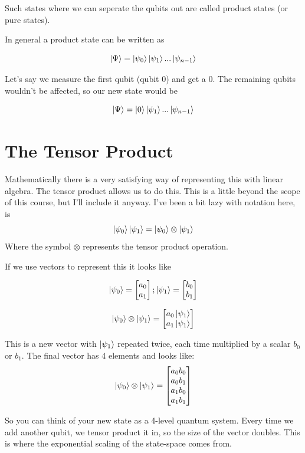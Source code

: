 \documentclass{book}
\begin{document}
Such states where we can seperate the qubits out are called product states (or pure states). 

In general a product state can be written as 

$$ \ket{\Psi} = \ket{\psi_0}\ket{\psi_1}...\ket{\psi_{n-1}}$$

Let's say we measure the first qubit (qubit 0) and get a 0. The remaining qubits wouldn't be affected, so our new state would be 

$$ \ket{\Psi} = \ket{0}\ket{\psi_1}...\ket{\psi_{n-1}}$$


\section{ The Tensor Product }

Mathematically there is a very satisfying way of representing this with linear algebra. The tensor product allows us to do this. This is a little beyond the scope of this course, but I'll include it anyway. 
I've been a bit lazy with notation here, is
$$ \ket{\psi_0}\ket{\psi_1} = \ket{\psi_0} \otimes \ket{\psi_1} $$
Where the symbol $\otimes$ represents the tensor product operation. 

If we use vectors to represent this it looks like 

$$ \ket{\psi_0} = \begin{bmatrix} a_0 \\ a_1 \end{bmatrix} ; \ket{\psi_1} = \begin{bmatrix} b_0 \\ b_1 \end{bmatrix} $$

$$
 \ket{\psi_0} \otimes \ket{\psi_1} = \begin{bmatrix} a_0\ket{\psi_1} \\ a_1\ket{\psi_1} \end{bmatrix}
$$

This is a new vector with $\ket{\psi_1}$ repeated twice, each time multiplied by a scalar $b_0$ or $b_1$. The final vector has 4 elements and looks like: 
$$
 \ket{\psi_0} \otimes \ket{\psi_1} = \begin{bmatrix} a_0 b_0 \\ a_0 b_1 \\ a_1b_0 \\ a_1 b_1 \end{bmatrix}
$$

So you can think of your new state as a 4-level quantum system. Every time we add another qubit, we tensor product it in, so the size of the vector doubles. This is where the exponential scaling of the state-space comes from.
\end{document}
